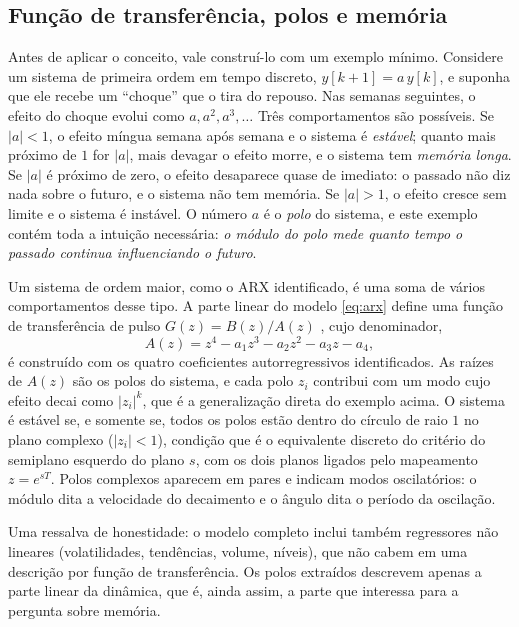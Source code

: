 \documentclass[conference]{IEEEtran}
\begin{document}
\subsection{Função de transferência, polos e memória}\label{sec:teoria-tf}

Antes de aplicar o conceito, vale construí-lo com um exemplo mínimo. Considere um sistema de primeira ordem em tempo discreto, $y[k+1] = a\,y[k]$, e suponha que ele recebe um ``choque'' que o tira do repouso. Nas semanas seguintes, o efeito do choque evolui como $a, a^2, a^3, \dots$ Três comportamentos são possíveis. Se $|a| < 1$, o efeito míngua semana após semana e o sistema é \emph{estável}; quanto mais próximo de $1$ for $|a|$, mais devagar o efeito morre, e o sistema tem \emph{memória longa}. Se $|a|$ é próximo de zero, o efeito desaparece quase de imediato: o passado não diz nada sobre o futuro, e o sistema não tem memória. Se $|a| > 1$, o efeito cresce sem limite e o sistema é instável. O número $a$ é o \emph{polo} do sistema, e este exemplo contém toda a intuição necessária: \emph{o módulo do polo mede quanto tempo o passado continua influenciando o futuro}.

Um sistema de ordem maior, como o ARX identificado, é uma soma de vários comportamentos desse tipo. A parte linear do modelo \eqref{eq:arx} define uma função de transferência de pulso $G(z) = B(z)/A(z)$ \cite{astrom1997}, cujo denominador,
\begin{equation}
A(z) = z^{4} - a_1 z^{3} - a_2 z^{2} - a_3 z - a_4,
\end{equation}
é construído com os quatro coeficientes autorregressivos identificados. As raízes de $A(z)$ são os polos do sistema, e cada polo $z_i$ contribui com um modo cujo efeito decai como $|z_i|^k$, que é a generalização direta do exemplo acima. O sistema é estável se, e somente se, todos os polos estão dentro do círculo de raio $1$ no plano complexo ($|z_i| < 1$), condição que é o equivalente discreto do critério do semiplano esquerdo do plano $s$, com os dois planos ligados pelo mapeamento $z = e^{sT}$. Polos complexos aparecem em pares e indicam modos oscilatórios: o módulo dita a velocidade do decaimento e o ângulo dita o período da oscilação.

Uma ressalva de honestidade: o modelo completo inclui também regressores não lineares (volatilidades, tendências, volume, níveis), que não cabem em uma descrição por função de transferência. Os polos extraídos descrevem apenas a parte linear da dinâmica, que é, ainda assim, a parte que interessa para a pergunta sobre memória.
\end{document}
